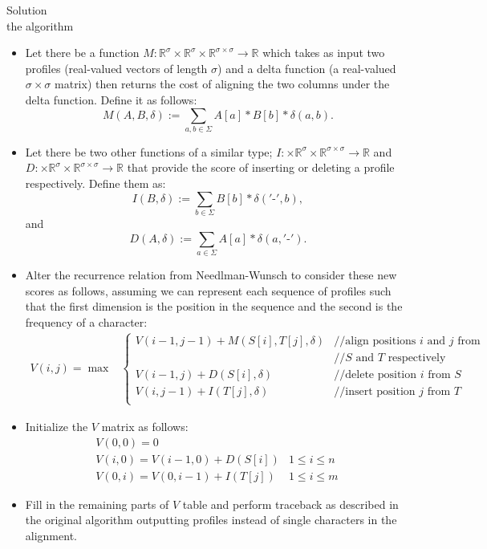 \documentclass[11pt, oneside]{article}   	%
\begin{document}
{\huge Solution}\\
{\Large the algorithm}
\begin{itemize}
\item Let there be a function $M:\mathbb{R}^\sigma\times\mathbb{R}^\sigma\times\mathbb{R}^{\sigma\times\sigma}\rightarrow\mathbb{R}$ 
which takes as input two profiles (real-valued vectors of length $\sigma$) 
and a delta function (a real-valued $\sigma\times\sigma$ matrix) 
then returns the cost of aligning the two columns under the delta function. 
 Define it as follows:
 \[
 	M(A,B,\delta) := \sum_{a,b\in\Sigma} A[a]*B[b]*\delta(a,b).
 \]
 \item Let there be two other functions of a similar type; 
 $I:\times\mathbb{R}^\sigma\times\mathbb{R}^{\sigma\times\sigma}\rightarrow\mathbb{R}$ and 
 $D:\times\mathbb{R}^\sigma\times\mathbb{R}^{\sigma\times\sigma}\rightarrow\mathbb{R}$ that provide the score of inserting or deleting a profile respectively. 
 Define them as: 
  \[
 	I(B,\delta) := \sum_{b\in\Sigma} B[b]*\delta('\texttt{-}',b),
 \] 
 and
  \[
 	D(A,\delta) := \sum_{a\in\Sigma} A[a]*\delta(a,'\texttt{-}').
 \]
 \item Alter the recurrence relation from Needlman-Wunsch to consider these new scores as follows, 
 assuming we can represent each sequence of profiles such that the first dimension is the position in the sequence and the second is the frequency of a character:
 \[
 \begin{array}{rl}
 V(i,j) = \max &
 
 \begin{cases}
V(i-1,j-1) + M(S[i],T[j],\delta) & // \text{align positions $i$ and $j$ from } \\
					   & // \text{$S$ and $T$ respectively} \\
V(i-1,j) + D(S[i],\delta)	   & // \text{delete position $i$ from $S$}\\
V(i,j-1) + I(T[j],\delta)	   & // \text{insert position $j$ from $T$}\\
 \end{cases}
 \end{array}
 \]
 \item Initialize the $V$ matrix as follows:
 \[
 	\begin{array}{ll}
	V(0,0) = 0 & \\
	V(i,0) = V(i-1,0) + D(S[i]) & 1 \le i \le n\\
	V(0,i) = V(0,i-1) + I(T[j]) & 1 \le i \le m\
	\end{array}
 \]
 \item Fill in the remaining parts of $V$ table and perform traceback as described in the original algorithm outputting profiles instead of single characters in the alignment. 
\end{itemize}
\end{document}
